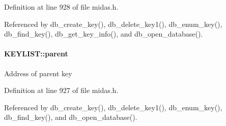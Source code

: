 Definition at line 928 of file midas.h.

Referenced by db\_\-create\_\-key(), db\_\-delete\_\-key1(), db\_\-enum\_\-key(), db\_\-find\_\-key(), db\_\-get\_\-key\_\-info(), and db\_\-open\_\-database().
\paragraph[{parent}]{ {\bf KEYLIST::parent}}\hfill\label{structKEYLIST_a9ee7404861b4dbcc3e79177ab1747678}
Address of parent key 

Definition at line 927 of file midas.h.

Referenced by db\_\-create\_\-key(), db\_\-delete\_\-key1(), db\_\-enum\_\-key(), db\_\-find\_\-key(), and db\_\-open\_\-database().